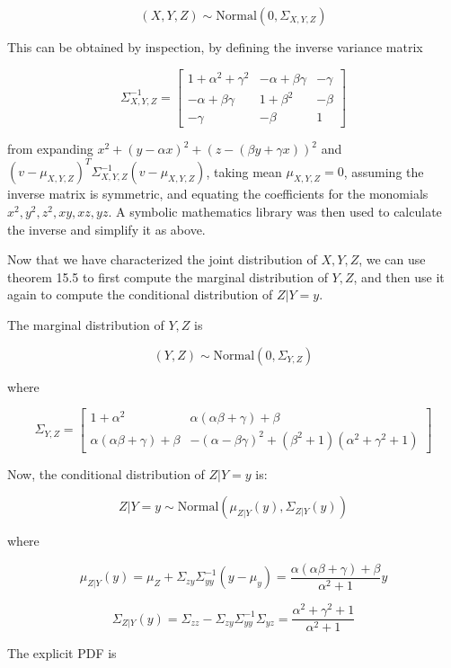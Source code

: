 \[ (X, Y, Z) \sim \text{Normal}(0, \Sigma_{X, Y, Z}) \]

This can be obtained by inspection, by defining the inverse variance
matrix

\[
\Sigma_{X, Y, Z}^{-1} = \begin{bmatrix}
1 + \alpha^2 + \gamma^2 & -\alpha + \beta \gamma & -\gamma \\
-\alpha + \beta \gamma  & 1 + \beta^2            & -\beta  \\
-\gamma                 & -\beta                 & 1
\end{bmatrix}
\]

from expanding \(x^2 + (y - \alpha x)^2 + (z - (\beta y + \gamma x))^2\)
and \((v - \mu_{X, Y, Z})^T \Sigma_{X, Y, Z}^{-1} (v - \mu_{X, Y, Z})\),
taking mean \(\mu_{X, Y, Z} = 0\), assuming the inverse matrix is
symmetric, and equating the coefficients for the monomials
\(x^2, y^2, z^2, xy, xz, yz\). A symbolic mathematics library was then
used to calculate the inverse and simplify it as above.

Now that we have characterized the joint distribution of \(X, Y, Z\), we
can use theorem 15.5 to first compute the marginal distribution of
\(Y, Z\), and then use it again to compute the conditional distribution
of \(Z | Y = y\).

The marginal distribution of \(Y, Z\) is

\[ (Y, Z) \sim \text{Normal}(0, \Sigma_{Y, Z})\]

where

\[ \Sigma_{Y, Z} = \begin{bmatrix}
1 + \alpha^2 & \alpha(\alpha \beta + \gamma) + \beta \\
\alpha(\alpha \beta + \gamma) + \beta & -(\alpha - \beta\gamma)^2 + (\beta^2 + 1)(\alpha^2 + \gamma^2 + 1)
\end{bmatrix} \]

Now, the conditional distribution of \(Z | Y = y\) is:

\[ Z | Y = y \sim \text{Normal}(\mu_{Z | Y} (y), \Sigma_{Z | Y}(y)) \]

where

\[ \mu_{Z | Y}(y) = \mu_Z + \Sigma_{zy} \Sigma_{yy}^{-1} (y - \mu_y) = \frac{\alpha(\alpha \beta + \gamma) + \beta}{\alpha^2 + 1} y\]

\[ \Sigma_{Z | Y}(y) = \Sigma_{zz} - \Sigma_{zy} \Sigma_{yy}^{-1} \Sigma_{yz} = \frac{\alpha^2 + \gamma^2 + 1}{\alpha^2 + 1}\]

The explicit PDF is

